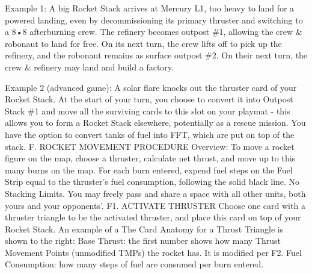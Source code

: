 \documentclass[a4paper]{book}
\begin{document}
Example 1: A big Rocket Stack arrives at Mercury L1, too heavy to land for a powered landing, even by decommissioning its primary thruster and switching to a 8•8 afterburning crew. The refinery becomes outpost \#1, allowing the crew \& robonaut to land for free. On its next turn, the crew lifts off to pick up the refinery, and the robonaut remains as surface outpost \#2. On their next turn, the crew \& refinery may land and build a factory.
 
Example 2 (advanced game): A solar flare knocks out the thruster card of your Rocket Stack. At the start of your turn, you choose to convert it into Outpost Stack \#1 and move all the surviving cards to this slot on your playmat - this allows you to form a Rocket Stack elsewhere, potentially as a rescue mission. You have the option to convert tanks of fuel into FFT, which are put on top of the stack.
F. ROCKET MOVEMENT PROCEDURE
Overview: To move a rocket figure on the map, choose a thruster, calculate net thrust, and move up to this many burns on the map. For each burn entered, expend fuel steps on the Fuel Strip equal to the thruster’s fuel consumption, following the solid black line.
No Stacking Limits. You may freely pass and share a space with all other units, both yours and your opponents’.
F1. ACTIVATE THRUSTER
Choose one card with a thruster triangle to be the activated thruster, and place this card on top of your Rocket Stack. An example of a The Card Anatomy for a Thrust Triangle is shown to the right:
Base Thrust: the first number shows how many Thrust Movement Points (unmodified TMPs) the rocket has. It is modified per F2.
Fuel Consumption: how many steps of fuel are consumed per burn entered.
\end{document}
